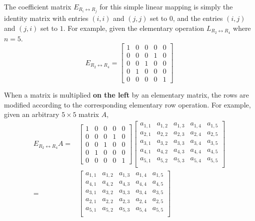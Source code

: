 \documentclass{article}
\begin{document}
The coefficient matrix \(E_{R_i \leftrightarrow R_j}\) for this simple linear mapping is simply the identity matrix with entries \((i, i)\) and \((j, j)\) set to \(0\), and the entries \((i,j)\) and \((j,i)\) set to \(1\). For example, given the elementary operation \(L_{R_2 \leftrightarrow R_4}\) where \(n = 5\). 
\[E_{R_2 \leftrightarrow R_4} = \begin{bmatrix} 
1 & 0 & 0 & 0 & 0 \\
0 & 0 & 0 & 1 & 0 \\
0 & 0 & 1 & 0 & 0 \\
0 & 1 & 0 & 0 & 0 \\
0 & 0 & 0 & 0 & 1
\end{bmatrix}\]

When a matrix is multiplied {\bf on the left} by an elementary matrix, the rows are modified according to the corresponding elementary row operation. For example, given an arbitrary \(5 \times 5\) matrix \(A\),
\begin{align*}
E_{R_2 \leftrightarrow R_4}A = & \begin{bmatrix} 
1 & 0 & 0 & 0 & 0 \\
0 & 0 & 0 & 1 & 0 \\
0 & 0 & 1 & 0 & 0 \\
0 & 1 & 0 & 0 & 0 \\
0 & 0 & 0 & 0 & 1
\end{bmatrix}\begin{bmatrix}
a_{1,1} & a_{1,2} & a_{1,3} & a_{1,4} & a_{1,5} \\ 
a_{2,1} & a_{2,2} & a_{2,3} & a_{2,4} & a_{2,5} \\ 
a_{3,1} & a_{3,2} & a_{3,3} & a_{3,4} & a_{3,5} \\ 
a_{4,1} & a_{4,2} & a_{4,3} & a_{4,4} & a_{4,5} \\ 
a_{5,1} & a_{5,2} & a_{5,3} & a_{5,4} & a_{5,5} \\ 
\end{bmatrix} \\
= & \begin{bmatrix}
a_{1,1} & a_{1,2} & a_{1,3} & a_{1,4} & a_{1,5} \\ 
a_{4,1} & a_{4,2} & a_{4,3} & a_{4,4} & a_{4,5} \\ 
a_{3,1} & a_{3,2} & a_{3,3} & a_{3,4} & a_{3,5} \\ 
a_{2,1} & a_{2,2} & a_{2,3} & a_{2,4} & a_{2,5} \\ 
a_{5,1} & a_{5,2} & a_{5,3} & a_{5,4} & a_{5,5} \\ 
\end{bmatrix}
\end{align*}
\end{document}

